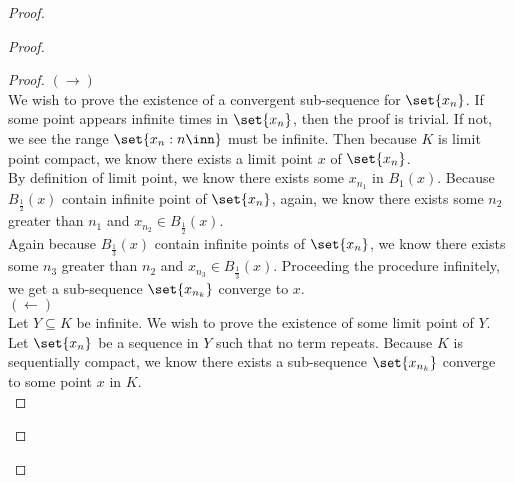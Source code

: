 \documentclass{report}
\begin{document}
\begin{proof}
\begin{proof}
\begin{proof}
$(\longrightarrow)$\\

We wish to prove the existence of a convergent sub-sequence for $\set{x_n}$. If some point appears infinite times in $\set{x_n}$, then the proof is trivial. If not, we see the range $\set{x_n:n\inn}$ must be infinite. Then because $K$ is limit point compact, we know there exists a limit point $x$ of $\set{x_n}$.\\

By definition of limit point, we know there exists some $x_{n_1}$ in $B_1(x)$. Because $B_{\frac{1}{2}}(x)$ contain infinite point of $\set{x_n}$, again, we know there exists some $n_2$ greater than  $n_1$ and  $x_{n_2}\in B_{\frac{1}{2}}(x)$.\\

Again because $B_{\frac{1}{3}}(x)$ contain infinite points of $\set{x_n}$, we know there exists some $n_3$ greater than  $n_2$ and $x_{n_3}\in B_{\frac{1}{3}}(x)$. Proceeding the procedure infinitely, we get a sub-sequence $\set{x_{n_k}}$ converge to $x$.\\

$(\longleftarrow)$\\

Let $Y\subseteq K$ be infinite. We wish to prove the existence of some limit point of $Y$.\\

Let $\set{x_n}$ be a sequence in $Y$ such that no term repeats. Because $K$ is sequentially compact, we know there exists a sub-sequence $\set{x_{n_k}}$ converge to some point $x$ in  $K$. \\


\end{proof}
\end{proof}
\end{proof}
\end{document}
